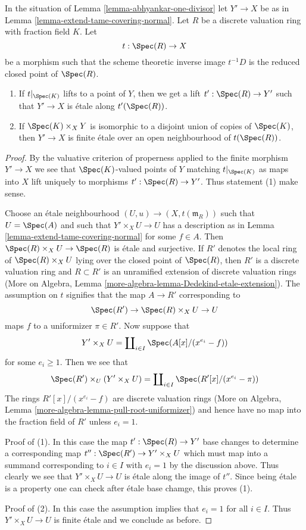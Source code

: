 \begin{lemma}
\label{lemma-tame-covering-split}
In the situation of Lemma \ref{lemma-abhyankar-one-divisor}
let $Y' \to X$ be as in Lemma \ref{lemma-extend-tame-covering-normal}.
Let $R$ be a discrete valuation ring with fraction field $K$.
Let
$$
t : \Spec(R) \to X
$$
be a morphism such that the scheme theoretic inverse image
$t^{-1}D$ is the reduced closed point of $\Spec(R)$.
\begin{enumerate}
\item If $t|_{\Spec(K)}$ lifts to a point of $Y$, then
we get a lift $t' : \Spec(R) \to Y'$ such that $Y' \to X$
is \'etale along $t'(\Spec(R))$.
\item If $\Spec(K) \times_X Y$ is isomorphic to a disjoint union
of copies of $\Spec(K)$, then $Y' \to X$ is finite \'etale
over an open neighbourhood of $t(\Spec(R))$.
\end{enumerate}
\end{lemma}

\begin{proof}
By the valuative criterion of properness applied to
the finite morphism $Y' \to X$ we see that $\Spec(K)$-valued
points of $Y$ matching $t|_{\Spec(K)}$ as maps into $X$
lift uniquely to morphisms $t' : \Spec(R) \to Y'$.
Thus statement (1) make sense.

\medskip\noindent
Choose an \'etale neighbourhood $(U, u) \to (X, t(\mathfrak m_R))$
such that $U = \Spec(A)$ and such that $Y' \times_X U \to U$
has a description as in Lemma \ref{lemma-extend-tame-covering-normal}
for some $f \in A$. Then $\Spec(R) \times_X U \to \Spec(R)$ is \'etale
and surjective. If $R'$ denotes the local ring of
$\Spec(R) \times_X U$ lying over the closed point of $\Spec(R)$,
then $R'$ is a discrete valuation ring and $R \subset R'$
is an unramified extension of discrete valuation rings
(More on Algebra, Lemma \ref{more-algebra-lemma-Dedekind-etale-extension}).
The assumption on $t$ signifies that the map $A \to R'$
corresponding to
$$
\Spec(R') \to \Spec(R) \times_X U \to U
$$
maps $f$ to a uniformizer $\pi \in R'$. Now suppose that
$$
Y' \times_X U =
\coprod\nolimits_{i \in I} \Spec(A[x]/(x^{e_i} - f))
$$
for some $e_i \geq 1$. Then we see that
$$
\Spec(R') \times_U (Y' \times_X U) =
\coprod\nolimits_{i \in I} \Spec(R'[x]/(x^{e_i} - \pi))
$$
The rings $R'[x]/(x^{e_i} - f)$ are discrete valuation rings
(More on Algebra, Lemma \ref{more-algebra-lemma-pull-root-uniformizer})
and hence have no map into the fraction field of $R'$ unless $e_i = 1$.

\medskip\noindent
Proof of (1). In this case the map $t' : \Spec(R) \to Y'$ base changes
to determine a corresponding map $t'' : \Spec(R') \to Y' \times_X U$
which must map into a summand corresponding to $i \in I$ with $e_i = 1$
by the discussion above. Thus clearly we see that $Y' \times_X U \to U$
is \'etale along the image of $t''$. Since being \'etale is a property
one can check after \'etale base chamge, this proves (1).

\medskip\noindent
Proof of (2). In this case the assumption implies that $e_i = 1$
for all $i \in I$. Thus $Y' \times_X U \to U$ is finite \'etale
and we conclude as before.
\end{proof}

